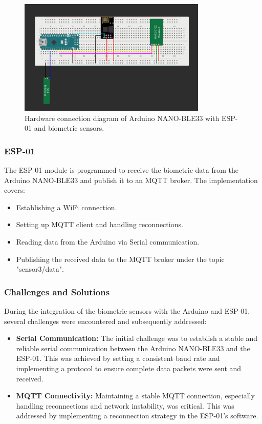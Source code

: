 \begin{figure}[h]
    \centering
    \includegraphics[width=0.8\textwidth]{../images/gsr&heart.png}
    \caption{Hardware connection diagram of Arduino NANO-BLE33 with ESP-01 and biometric sensors.}
    \label{fig:hardware-setup}
\end{figure}


\subsubsection{ESP-01}
The ESP-01 module is programmed to receive the biometric data from the Arduino NANO-BLE33 and publish it to an MQTT broker. The implementation covers:
\begin{itemize}
    \item Establishing a WiFi connection.
    \item Setting up MQTT client and handling reconnections.
    \item Reading data from the Arduino via Serial communication.
    \item Publishing the received data to the MQTT broker under the topic "sensor3/data".
\end{itemize}

\subsubsection{Challenges and Solutions}
During the integration of the biometric sensors with the Arduino and ESP-01, several challenges were encountered and subsequently addressed:
\begin{itemize}
\item \textbf{Serial Communication:} The initial challenge was to establish a stable and reliable serial communication between the Arduino NANO-BLE33 and the ESP-01. This was achieved by setting a consistent baud rate and implementing a protocol to ensure complete data packets were sent and received.
\item \textbf{MQTT Connectivity:} Maintaining a stable MQTT connection, especially handling reconnections and network instability, was critical. This was addressed by implementing a reconnection strategy in the ESP-01’s software.
\end{itemize}

